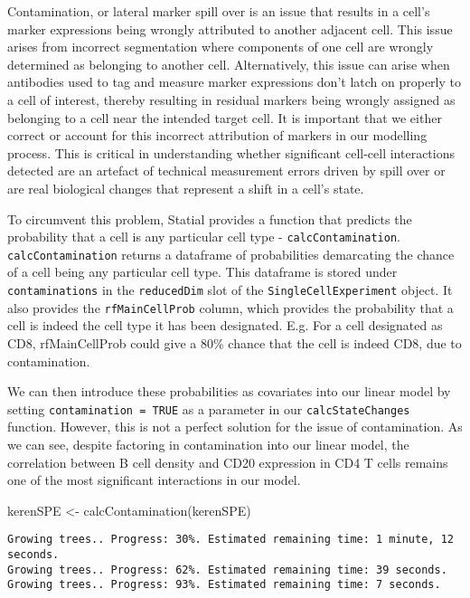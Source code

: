 \documentclass[
  letterpaper,
  DIV=11,
  numbers=noendperiod]{scrreprt}
\newenvironment{Shaded}{\begin{snugshade}}{\end{snugshade}}
\newcommand{\FunctionTok}[1]{\textcolor[rgb]{0.28,0.35,0.67}{#1}}
\newcommand{\NormalTok}[1]{\textcolor[rgb]{0.00,0.23,0.31}{#1}}
\newcommand{\OtherTok}[1]{\textcolor[rgb]{0.00,0.23,0.31}{#1}}
\begin{document}
Contamination, or lateral marker spill over is an issue that results in
a cell's marker expressions being wrongly attributed to another adjacent
cell. This issue arises from incorrect segmentation where components of
one cell are wrongly determined as belonging to another cell.
Alternatively, this issue can arise when antibodies used to tag and
measure marker expressions don't latch on properly to a cell of
interest, thereby resulting in residual markers being wrongly assigned
as belonging to a cell near the intended target cell. It is important
that we either correct or account for this incorrect attribution of
markers in our modelling process. This is critical in understanding
whether significant cell-cell interactions detected are an artefact of
technical measurement errors driven by spill over or are real biological
changes that represent a shift in a cell's state.

To circumvent this problem, Statial provides a function that predicts
the probability that a cell is any particular cell type -
\texttt{calcContamination}. \texttt{calcContamination} returns a
dataframe of probabilities demarcating the chance of a cell being any
particular cell type. This dataframe is stored under
\texttt{contaminations} in the \texttt{reducedDim} slot of the
\texttt{SingleCellExperiment} object. It also provides the
\texttt{rfMainCellProb} column, which provides the probability that a
cell is indeed the cell type it has been designated. E.g. For a cell
designated as CD8, rfMainCellProb could give a 80\% chance that the cell
is indeed CD8, due to contamination.

We can then introduce these probabilities as covariates into our linear
model by setting \texttt{contamination\ =\ TRUE} as a parameter in our
\texttt{calcStateChanges} function. However, this is not a perfect
solution for the issue of contamination. As we can see, despite
factoring in contamination into our linear model, the correlation
between B cell density and CD20 expression in CD4 T cells remains one of
the most significant interactions in our model.

\begin{Shaded}
\begin{Highlighting}[]
\NormalTok{kerenSPE }\OtherTok{\textless{}{-}} \FunctionTok{calcContamination}\NormalTok{(kerenSPE)}
\end{Highlighting}
\end{Shaded}

\begin{verbatim}
Growing trees.. Progress: 30%. Estimated remaining time: 1 minute, 12 seconds.
Growing trees.. Progress: 62%. Estimated remaining time: 39 seconds.
Growing trees.. Progress: 93%. Estimated remaining time: 7 seconds.
\end{verbatim}
\end{document}
